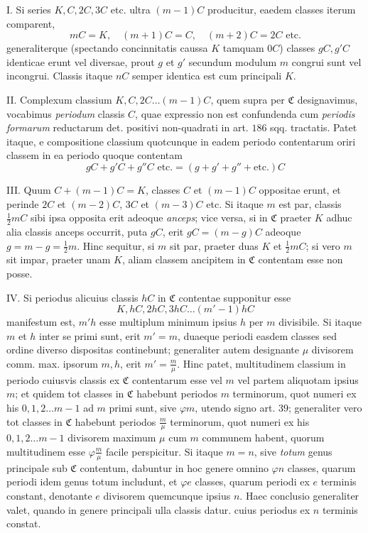 I. Si series \(K,C,2C,3C\) etc. ultra \((m-1)C\) producitur, eaedem classes iterum comparent,
\[mC=K,\quad(m+1)C=C,\quad(m+2)C=2C\text{ etc.}\]
generaliterque (spectando concinnitatis caussa \(K\) tamquam \(0C\)) classes \(gC,g'C\) identicae erunt vel diversae, prout \(g\) et \(g'\) secundum modulum \(m\) congrui sunt vel incongrui. Classis itaque \(nC\) semper identica est cum principali \(K\).

II. Complexum classium \(K,C,2C\ldots(m-1)C\), quem supra per \(\mathfrak C\) designavimus, vocabimus \textit{periodum} classis \(C\), quae expressio non est confundenda cum \textit{periodis formarum} reductarum det. positivi non-quadrati in art. \(186\) sqq. tractatis. Patet itaque, e compositione classium quotcunque in eadem periodo contentarum oriri classem in ea periodo quoque contentam
\[gC+g'C+g''C\text{ etc.}=(g+g'+g''+\text{etc.})C\]


III. Quum \(C+(m-1)C=K\), classes \(C\) et \((m-1)C\) oppositae erunt, et perinde \(2C\) et \((m-2)C\), \(3C\) et \((m-3)C\) etc. Si itaque \(m\) est par, classis \(\tfrac12mC\) sibi ipsa opposita erit adeoque \textit{anceps}; vice versa, si in \(\mathfrak C\) praeter \(K\) adhuc alia classis anceps occurrit, puta \(gC\), erit \(gC=(m-g)C\) adeoque \(g=m-g=\tfrac12m\). Hinc sequitur, si \(m\) sit par, praeter duas \(K\) et \(\tfrac12mC\);
si vero \(m\) sit impar, praeter unam \(K\), aliam classem ancipitem in \(\mathfrak C\) contentam esse non posse.

IV. Si periodus alicuius classis \(hC\) in \(\mathfrak C\) contentae supponitur esse
\[K,hC,2hC,3hC\ldots(m'-1)hC\]
manifestum est, \(m'h\) esse multiplum minimum ipsius \(h\) per \(m\) divisibile. Si itaque \(m\) et \(h\) inter se primi sunt, erit \(m'=m\), duaeque periodi easdem classes sed ordine diverso dispositas continebunt; generaliter autem designante \(\mu\) divisorem comm. max. ipsorum \(m,h\), erit \(m'=\frac m\mu\). Hinc patet, multitudinem classium in periodo cuiusvis classis ex \(\mathfrak C\) contentarum esse vel \(m\) vel partem aliquotam ipsius \(m\); et quidem tot classes in \(\mathfrak C\) habebunt periodos \(m\) terminorum, quot numeri ex his \(0,1,2\ldots m-1\) ad \(m\) primi sunt, sive \(\varphi m\), utendo signo art. \(39\); generaliter vero tot classes in \(\mathfrak C\) habebunt periodos \(\frac m\mu\) terminorum, quot numeri ex his \(0,1,2\ldots m-1\) divisorem maximum \(\mu\) cum \(m\) communem habent, quorum multitudinem esse \(\varphi\frac m\mu\) facile perspicitur. Si itaque \(m=n\), sive \textit{totum} genus principale sub \(\mathfrak C\) contentum, dabuntur in hoc genere omnino \(\varphi n\) classes, quarum periodi idem genus totum includunt, et \(\varphi e\) classes, quarum periodi ex \(e\) terminis constant, denotante \(e\) divisorem quemcunque ipsius \(n\). Haec conclusio generaliter valet, quando in genere principali ulla classis datur. cuius periodus ex \(n\) terminis constat.

